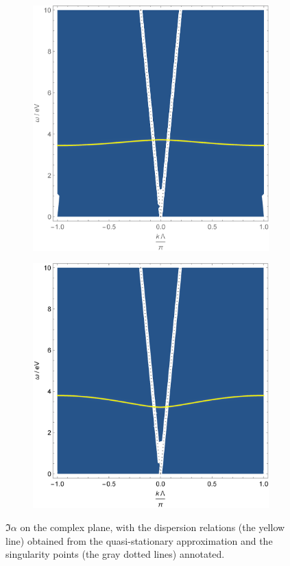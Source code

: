 \documentclass[hyperref, a4paper]{article}
\begin{document}
\begin{figure}
    \centering
    \begin{subfigure}{0.45\textwidth}
        \includegraphics[width=\textwidth]{alphaxy-annotated.pdf}
    \end{subfigure}
    \begin{subfigure}{0.45\textwidth}
        \includegraphics[width=\textwidth]{alphaz-annotated.pdf}
    \end{subfigure}
    \caption{$\Im \alpha$ on the complex plane, with the dispersion relations (the yellow line) obtained from the 
    quasi-stationary approximation and the singularity points (the gray dotted lines) annotated.}
    \label{fig:all}
\end{figure}
\end{document}
